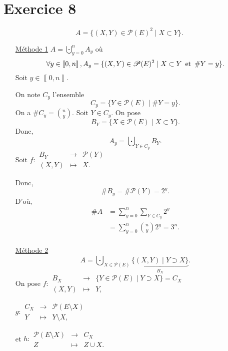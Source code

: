 \part{Exercice 8}

\[
	A = \{(X,Y) \in \mathcal{P}(E)^2  \mid X \subset Y\}.
\]
\begin{itemize}
	\item[\underline{\sc Méthode 1}] $A = \bigcupdot_{y=0}^n A_y$
		où \[
			\forall y \in \left\llbracket 0,n \right\rrbracket, A_y = \{(X,Y) \in \mathcal{P}(E)^2  \mid X\subset Y \operatorname{\text{ et }} \#Y = y\}.
		\]
		Soit $y \in \left\llbracket 0,n \right\rrbracket$.
		
		On note $C_y$ l'ensemble \[
			C_y = \{Y \in \mathcal{P}(E)  \mid \#Y = y\}.
		\] On a $\#C_y = {n \choose y}$. Soit $Y \in C_y$. On pose \[
			B_Y = \{X \in \mathcal{P}(E)  \mid X \subset Y\}.
		\] Donc, \[
			A_y = \bigcupdot_{Y \in C_y} B_Y.
		\] Soit $f : \begin{array}{rcl}
			B_Y &\longrightarrow& \mathcal{P}(Y) \\
			(X,Y) &\longmapsto& X.
		\end{array}$

		Donc, \[
			\#B_y = \#\mathcal{P}(Y) = 2^y.
		\] D'où,
		\begin{align*}
			\#A &= \sum_{y=0}^n \sum_{Y \in C_y} 2^y\\
			&= \sum_{y=0}^n {n \choose y} 2^y = 3^n. \\
		\end{align*}
	\item[\underline{\sc Méthode 2}] \[
			A = \bigcupdot_{X \in \mathcal{P}(E)} \underbrace{\{(X,Y) \mid Y \supset X\}}_{B_X}.
		\]
		On pose $f : \begin{array}{rcl}
			B_X &\longrightarrow& \{Y \in \mathcal{P}(E)  \mid Y \supset X\} = C_X \\
			(X,Y) &\longmapsto& Y,
		\end{array}$

		$g : \begin{array}{rcl}
			C_X &\longrightarrow& \mathcal{P}(E \setminus X) \\
			Y &\longmapsto& Y\setminus X,
		\end{array}$

		et $h : \begin{array}{rcl}
			\mathcal{P}(E\setminus X) &\longrightarrow& C_X \\
			Z &\longmapsto& Z \cup X.
		\end{array}$


\end{itemize}
